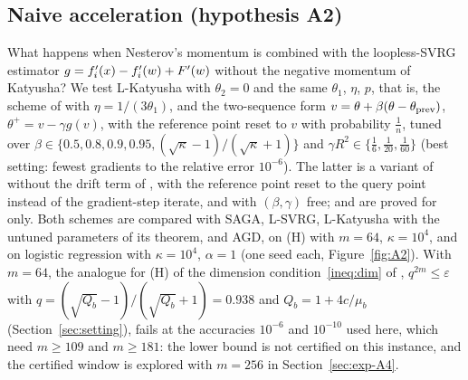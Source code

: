 \subsection{Naive acceleration (hypothesis A2)}\label{sec:exp-A2}

What happens when Nesterov's momentum is combined with the loopless-SVRG estimator $g=f'_i(x)-f'_i(w)+F'(w)$ without the
negative momentum of Katyusha? We test L-Katyusha with $\theta_2=0$ and the same $\theta_1$, $\eta$, $p$, that is, the
scheme of  with $\eta=1/(3\theta_1)$, and the two-sequence form
$v=\theta+\beta(\theta-\theta_{\rm prev})$, $\theta^+=v-\gamma g(v)$, with the reference point reset to $v$ with
probability $\frac1n$, tuned over $\beta\in\{0.5,0.8,0.9,0.95,(\sqrt\kappa-1)/(\sqrt\kappa+1)\}$ and
$\gamma R^2\in\{\frac16,\frac1{20},\frac1{60}\}$ (best setting: fewest gradients to the relative error $10^{-6}$). The
latter is a variant of  without the drift term of , with the reference point
reset to the query point instead of the gradient-step iterate, and with $(\beta,\gamma)$ free;  and
 are proved for  only. Both schemes are compared with SAGA, L-SVRG, L-Katyusha
with the untuned parameters of its theorem, and AGD, on (H) with $m=64$, $\kappa=10^4$, and on logistic regression with
$\kappa=10^4$, $\alpha=1$ (one seed each, Figure~\ref{fig:A2}). With $m=64$, the analogue for (H) of the dimension
condition~\eqref{ineq:dim} of , $q^{2m}\le\varepsilon$ with $q=(\sqrt{Q_b}-1)/(\sqrt{Q_b}+1)=0.938$ and
$Q_b=1+4c/\mu_b$ (Section~\ref{sec:setting}), fails at the accuracies $10^{-6}$ and $10^{-10}$ used here, which need
$m\ge109$ and $m\ge181$: the lower bound is not certified on this instance, and the certified window is explored with
$m=256$ in Section~\ref{sec:exp-A4}.


